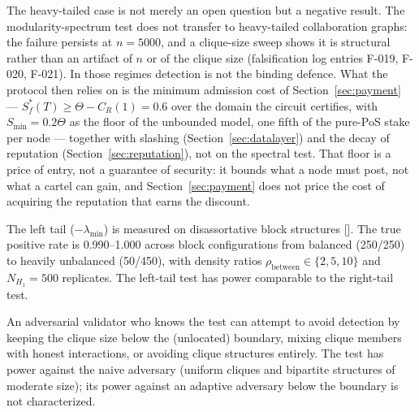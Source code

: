 \documentclass[11pt,a4paper]{article}
\newcommand{\fref}[1]{[\path{#1}]}
\numberwithin{equation}{section}
\numberwithin{table}{section}
\begin{document}
The heavy-tailed case is not merely an open question but a negative result. The modularity-spectrum test does not transfer to heavy-tailed collaboration graphs: the failure persists at $n = 5000$, and a clique-size sweep shows it is structural rather than an artifact of $n$ or of the clique size (falsification log entries F-019, F-020, F-021). In those regimes detection is not the binding defence. What the protocol then relies on is the minimum admission cost of Section~\ref{sec:payment} --- $S_f^*(T) \geq \Theta - C_R(1) = 0.6$ over the domain the circuit certifies, with $S_{\min} = 0.2\Theta$ as the floor of the unbounded model, one fifth of the pure-PoS stake per node --- together with slashing (Section~\ref{sec:datalayer}) and the decay of reputation (Section~\ref{sec:reputation}), not on the spectral test. That floor is a price of entry, not a guarantee of security: it bounds what a node must post, not what a cartel can gain, and Section~\ref{sec:payment} does not price the cost of acquiring the reputation that earns the discount.

The left tail ($-\lambda_{\min}$) is measured on disassortative block structures \fref{verification/rmt/bipartite_power.py}. The true positive rate is 0.990--1.000 across block configurations from balanced (250/250) to heavily unbalanced (50/450), with density ratios $\rho_{\text{between}} \in \{2, 5, 10\}$ and $N_{H_1} = 500$ replicates. The left-tail test has power comparable to the right-tail test.

An adversarial validator who knows the test can attempt to avoid detection by keeping the clique size below the (unlocated) boundary, mixing clique members with honest interactions, or avoiding clique structures entirely. The test has power against the naive adversary (uniform cliques and bipartite structures of moderate size); its power against an adaptive adversary below the boundary is not characterized.
\end{document}
